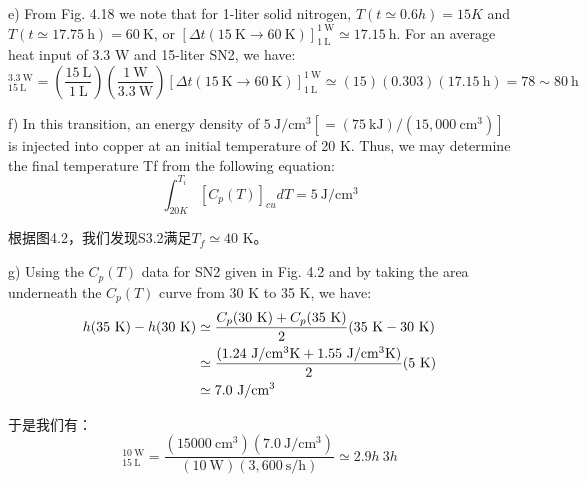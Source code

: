 e) From Fig. 4.18 we note that for 1-liter solid nitrogen, $T(t\simeq 0.6 h)=15 K$ and
$T(t\simeq 17.75\ \mathrm{h}) = 60\ \mathrm{K}$, or  $[\Delta t(15\ \mathrm{K}\rightarrow 60\ \mathrm{K})]_{1\ \mathrm{L}}^{1\ \mathrm{W}}\simeq 17.15\ \mathrm{h}$. For an average heat
input of 3.3 W and 15-liter SN2, we have:
\begin{equation*}%
[\Delta t(15\ \mathrm{K} \rightarrow 60\ \mathrm{K})]_{15\ \mathrm{L}}^{3.3\ \mathrm{W}}=(\frac{15\ \mathrm{L}}{1\ \mathrm{L}})(\frac{1\ \mathrm{W}}{3.3\ \mathrm{W}})[\Delta t(15\ \mathrm{K}\rightarrow 60\ \mathrm{K})]_{1\ \mathrm{L}}^{1\ \mathrm{W}}
\simeq(15)(0.303)(17.15\ \mathrm{h})
=78\sim 80\ \mathrm{h}
\end{equation*}

f) In this transition, an energy density of $5\ \mathrm{J/cm^3}[= (75\ \mathrm{kJ})/(15,000\ \mathrm{cm^3})]$ is injected into copper at an initial temperature of 20 K. Thus, we may determine
the final temperature Tf from the following equation:
\begin{equation*}%
\int_{20K}^{T_i}[C_p(T)]_{cu}dT=5\ \mathrm{J/cm^3}
\end{equation*}

根据图4.2，我们发现S3.2满足$T_f\simeq 40$ K。

g) Using the $C_p(T)$ data for SN2 given in Fig. 4.2 and by taking the area underneath the $C_p(T)$ curve from 30 K to 35 K, we have:
\begin{align*}%
h(35\ \mathrm{K})-h(30\ \mathrm{K})&\simeq\frac{C_p(30\ \mathrm{K})+C_p(35\ \mathrm{K})}{2}(35\ \mathrm{K}-30\ \mathrm{K})\\\notag
&\simeq\frac{(1.24\ \mathrm{J/cm^3 K}+1.55\ \mathrm{J/cm^3 K})}{2}(5\ \mathrm{K})\\\notag
&\simeq 7.0\ \mathrm{J/cm^3}
\end{align*}

于是我们有：
\begin{equation*}%
[\Delta t(30\ \mathrm{K} \rightarrow 35\ \mathrm{K})]_{15\ \mathrm{L}}^{10\ \mathrm{W}}=\frac{(15000\ \mathrm{cm^3})(7.0\ \mathrm{J/cm^3})}{(10\ \mathrm{W})(3,600\ \mathrm{s/h})}
\simeq 2.9 h~3 h
\end{equation*}


